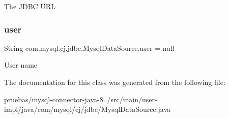 The J\+D\+BC U\+RL \mbox{\label{classcom_1_1mysql_1_1cj_1_1jdbc_1_1_mysql_data_source_ac4bb1de22b71046ca05c46ec7b2769b9}} 
\subsubsection{\texorpdfstring{user}{user}}
{\footnotesize\ttfamily String com.\+mysql.\+cj.\+jdbc.\+Mysql\+Data\+Source.\+user = null\hspace{0.3cm}{\ttfamily [protected]}}

User name 

The documentation for this class was generated from the following file\+:\begin{DoxyCompactItemize}
\item 
pruebas/mysql-\/connector-\/java-\/8../src/main/user-\/impl/java/com/mysql/cj/jdbc/Mysql\+Data\+Source.\+java\end{DoxyCompactItemize}
